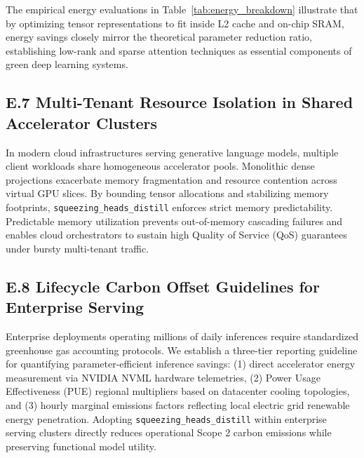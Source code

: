 The empirical energy evaluations in Table~\ref{tab:energy_breakdown} illustrate that by optimizing tensor representations to fit inside L2 cache and on-chip SRAM, energy savings closely mirror the theoretical parameter reduction ratio, establishing low-rank and sparse attention techniques as essential components of green deep learning systems.

\subsection*{E.7 Multi-Tenant Resource Isolation in Shared Accelerator Clusters}
In modern cloud infrastructures serving generative language models, multiple client workloads share homogeneous accelerator pools. Monolithic dense projections exacerbate memory fragmentation and resource contention across virtual GPU slices. By bounding tensor allocations and stabilizing memory footprints, \texttt{squeezing\_heads\_distill} enforces strict memory predictability. Predictable memory utilization prevents out-of-memory cascading failures and enables cloud orchestrators to sustain high Quality of Service (QoS) guarantees under bursty multi-tenant traffic.

\subsection*{E.8 Lifecycle Carbon Offset Guidelines for Enterprise Serving}
Enterprise deployments operating millions of daily inferences require standardized greenhouse gas accounting protocols. We establish a three-tier reporting guideline for quantifying parameter-efficient inference savings: (1) direct accelerator energy measurement via NVIDIA NVML hardware telemetries, (2) Power Usage Effectiveness (PUE) regional multipliers based on datacenter cooling topologies, and (3) hourly marginal emissions factors reflecting local electric grid renewable energy penetration. Adopting \texttt{squeezing\_heads\_distill} within enterprise serving clusters directly reduces operational Scope 2 carbon emissions while preserving functional model utility.
